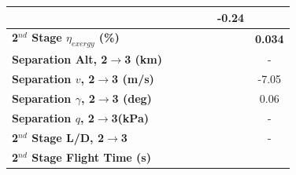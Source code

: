 \begin{table}[ht]
\begin{tabular}{l c c c c c c}
		& \firstsecondSeparationgammamThreeNinetyFiveNoReturn
		& \firstsecondSeparationgammamThreeStandardNoReturn
		& \firstsecondSeparationgammamThreeOneHundredFiveNoReturn
		& \firstsecondSeparationgammamThreeOneHundredTenNoReturn
		&-0.24
		\\
		\hline 
		\textbf{2$^{nd}$ Stage $\eta_{exergy}$ (\%)}
		& \textbf{\secondExergyEffmThreeNinetyNoReturn}
		& \textbf{\secondExergyEffmThreeNinetyFiveNoReturn}
		& \textbf{\secondExergyEffmThreeStandardNoReturn}
		& \textbf{\secondExergyEffmThreeOneHundredFiveNoReturn}
		& \textbf{\secondExergyEffmThreeOneHundredTenNoReturn}
		& \textbf{0.034}
		\\
		\textbf{Separation Alt, 2$\rightarrow$3 (km)}
		& \secondthirdSeparationAltmThreeNinetyNoReturn
		& \secondthirdSeparationAltmThreeNinetyFiveNoReturn
		& \secondthirdSeparationAltmThreeStandardNoReturn
		& \secondthirdSeparationAltmThreeOneHundredFiveNoReturn
		& \secondthirdSeparationAltmThreeOneHundredTenNoReturn
		& -
		\\
		\textbf{Separation $v$, 2$\rightarrow$3 (m/s)}
		& \secondthirdSeparationvmThreeNinetyNoReturn
		& \secondthirdSeparationvmThreeNinetyFiveNoReturn
		& \secondthirdSeparationvmThreeStandardNoReturn
		& \secondthirdSeparationvmThreeOneHundredFiveNoReturn
		& \secondthirdSeparationvmThreeOneHundredTenNoReturn
		&-7.05
		\\
		\textbf{Separation $\gamma$, 2$\rightarrow$3 (deg)}
		& \secondthirdSeparationgammamThreeNinetyNoReturn
		& \secondthirdSeparationgammamThreeNinetyFiveNoReturn
		& \secondthirdSeparationgammamThreeStandardNoReturn
		& \secondthirdSeparationgammamThreeOneHundredFiveNoReturn
		& \secondthirdSeparationgammamThreeOneHundredTenNoReturn
		&0.06
		\\
		\textbf{Separation $q$, 2$\rightarrow$3(kPa)}
		& \secondthirdSeparationqmThreeNinetyNoReturn
		& \secondthirdSeparationqmThreeNinetyFiveNoReturn
		& \secondthirdSeparationqmThreeStandardNoReturn
		& \secondthirdSeparationqmThreeOneHundredFiveNoReturn
		& \secondthirdSeparationqmThreeOneHundredTenNoReturn
		& -
		\\
		\textbf{2$^{nd}$ Stage L/D, 2$\rightarrow$3}
		& \secondthirdSeparationLDmThreeNinetyNoReturn
		& \secondthirdSeparationLDmThreeNinetyFiveNoReturn
		& \secondthirdSeparationLDmThreeStandardNoReturn
		& \secondthirdSeparationLDmThreeOneHundredFiveNoReturn
		& \secondthirdSeparationLDmThreeOneHundredTenNoReturn
		& -
		\\
		\textbf{2$^{nd}$ Stage Flight Time (s)}
		& \secondFlightTimemThreeNinetyNoReturn

\end{tabular}
\end{table}
